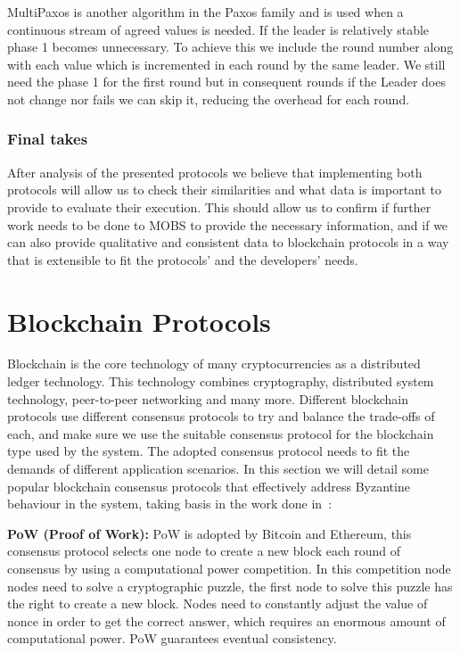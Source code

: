 MultiPaxos is another algorithm in the Paxos family and is used when a
continuous stream of agreed values is needed.
If the leader is relatively stable phase 1 becomes unnecessary. To achieve this
we include the round number along with each value which is incremented in each round
by the same leader. We still need the phase 1 for the first round but in
consequent rounds if the Leader does not change nor fails we can skip it, reducing
the overhead for each round.

\subsubsection{Final takes}\label{subsec:final_takes_consensus}

After analysis of the presented protocols we believe that implementing both protocols
will allow us to check their similarities and what data is important to provide
to evaluate their execution. This should allow us to confirm if further work
needs to be done to MOBS to provide the necessary information, and if we can also
provide qualitative and consistent data to blockchain protocols in a way that is
extensible to fit the protocols' and the developers' needs.

\section{Blockchain Protocols}\label{sec:blockchain}

Blockchain is the core technology of many cryptocurrencies as a distributed
ledger technology. This technology combines cryptography, distributed system
technology, peer-to-peer networking and many more. Different blockchain
protocols use different consensus protocols to try and balance the trade-offs of
each, and make sure we use the suitable consensus protocol for the blockchain type
used by the system. The adopted consensus protocol needs to fit the demands of
different application scenarios. In this section we will detail some popular
blockchain consensus protocols that effectively address Byzantine behaviour
in the system, taking basis in the work done in~\cite{blockchain_consensus}:

\textbf{PoW (Proof of Work):} PoW is adopted by Bitcoin and Ethereum,
this consensus protocol selects one node to create a new block 
each round of consensus by using a computational power competition. In this
competition node nodes need to solve a cryptographic puzzle, the first node to solve
this puzzle has the right to create a new block. Nodes need to constantly adjust the
value of nonce in order to get the correct answer, which requires an enormous amount
of computational power. PoW guarantees eventual consistency.


